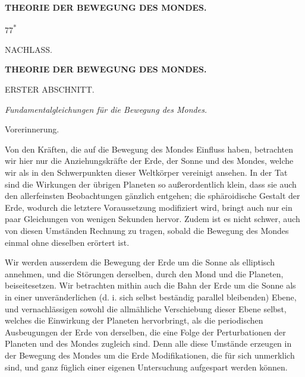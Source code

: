 \clearpage
\begingroup
{}
\renewcommand{\headrulewidth}{0pt}
\clearpage
{}
\begin{center}
\vspace*{.15\textheight}
{\Large\bfseries THEORIE DER BEWEGUNG DES MONDES.\par}
\end{center}
\vspace{.28\textheight}
\par\noindent\hfill 77\textsuperscript{*}\par

\clearpage
{}
\begin{center}
{\large NACHLASS.\par}
\bigskip
{\Large\bfseries THEORIE DER BEWEGUNG DES MONDES.\par}
\bigskip
ERSTER ABSCHNITT.
\medskip

\textit{Fundamentalgleichungen für die Bewegung des Mondes.}
\bigskip

{\large Vorerinnerung.\par}
\end{center}

\par\noindent\hspace*{\parindent}Von den Kräften, die auf die Bewegung des Mondes Einfluss haben, betrachten
wir hier nur die Anziehungskräfte der Erde, der Sonne und des Mondes, welche
wir als in den Schwerpunkten dieser Weltkörper vereinigt ansehen. In der
Tat sind die Wirkungen der übrigen Planeten so außerordentlich klein, dass
sie auch den allerfeinsten Beobachtungen gänzlich entgehen; die sphäroidische
Gestalt der Erde, wodurch die letztere Voraussetzung modifiziert wird, bringt
auch nur ein paar Gleichungen von wenigen Sekunden hervor. Zudem ist es
nicht schwer, auch von diesen Umständen Rechnung zu tragen, sobald die
Bewegung des Mondes einmal ohne dieselben erörtert ist.

\par\noindent\hspace*{\parindent}Wir werden ausserdem die Bewegung der Erde um die Sonne als elliptisch
annehmen, und die Störungen derselben, durch den Mond und die Planeten,
beiseitesetzen. Wir betrachten mithin auch die Bahn der Erde um die Sonne als
in einer unveränderlichen (d. i. sich selbst beständig parallel bleibenden)
Ebene, und vernachlässigen sowohl die allmähliche Verschiebung
dieser Ebene selbst, welches die Einwirkung der Planeten hervorbringt,
als die periodischen Ausbeugungen der Erde von derselben, die eine Folge der
Perturbationen der Planeten und des Mondes zugleich sind. Denn alle diese
Umstände erzeugen in der Bewegung des Mondes um die Erde Modifikationen, die
für sich unmerklich sind, und ganz füglich einer eigenen Untersuchung
aufgespart werden können.

